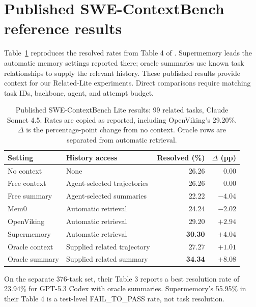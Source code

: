 \section{Published SWE-ContextBench reference results}
\label{sec:published-swectx}

Table~\ref{tab:published-swectx-lite} reproduces the resolved rates from
Table 4 of \citet{swecontext2026}. Supermemory leads the automatic
memory settings reported there; oracle summaries use known task relationships
to supply the relevant history. These published results provide context for
our Related-Lite experiments. Direct comparisons require matching task IDs,
backbone, agent, and attempt budget.

\begin{table}[htbp]
\centering
\caption{Published SWE-ContextBench Lite results: 99 related tasks,
Claude Sonnet 4.5. Rates are copied as reported, including OpenViking's
29.20\%. $\Delta$ is the percentage-point change from no context.
Oracle rows are separated from automatic retrieval.}
\label{tab:published-swectx-lite}
\small
\begin{tabular}{llrr}
\toprule
Setting & History access & Resolved (\%) & $\Delta$ (pp) \\
\midrule
No context & None & 26.26 & 0.00 \\
Free context & Agent-selected trajectories & 26.26 & 0.00 \\
Free summary & Agent-selected summaries & 22.22 & $-4.04$ \\
Mem0 & Automatic retrieval & 24.24 & $-2.02$ \\
OpenViking & Automatic retrieval & 29.20 & $+2.94$ \\
Supermemory & Automatic retrieval & \textbf{30.30} & $+4.04$ \\
\midrule
Oracle context & Supplied related trajectory & 27.27 & $+1.01$ \\
Oracle summary & Supplied related summary & \textbf{34.34} & $+8.08$ \\
\bottomrule
\end{tabular}
\end{table}

On the separate 376-task set, their Table 3 reports a best resolution rate of
23.94\% for GPT-5.3 Codex with oracle summaries. Supermemory's 55.95\%
in their Table 4 is a test-level FAIL\_TO\_PASS rate, not task resolution.
